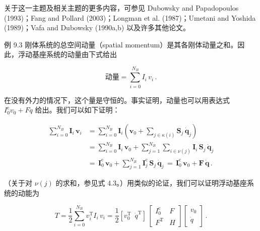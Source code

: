 \documentclass[10pt,a4paper]{book}
\theoremstyle{thmstyle} %
\theoremstyle{defstyle} %
\theoremstyle{prostyle} %
\begin{document}
关于这一主题及相关主题的更多内容，可参见 Dubowsky and Papadopoulos (1993)；Fang and Pollard (2003)；Longman et al. (1987)；Umetani and Yoshida (1989)；Vafa and Dubowsky (1990a,b) 以及许多其他论文。



例 9.3 刚体系统的总空间动量（spatial momentum）是其各刚体动量之和。因此，浮动基座系统的动量由下式给出



$$
动量 = \sum _ { i = 0 } ^{N _ { B} } I _ { i } \, v _ { i } \, .
$$



在没有外力的情况下，这个量是守恒的。事实证明，动量也可以用表达式 $I_{0}^{\mathrm{c}}v_{0}+F\dot{q}$ 给出。我们可以如下证明：



$$
\begin{array}{rl} { \displaystyle \sum _ { i = 0 } ^{N _ { B} } { \boldsymbol { I } } _ { i } \, { \boldsymbol { v } } _ { i } } & { = \displaystyle \sum _ { i = 0 } ^{N _ { B} } { \boldsymbol { I } } _ { i } \left( { \boldsymbol { v } } _ { 0 } + \sum _ { j \in \kappa ( i ) } { \boldsymbol { S } } _ { j } \, { \dot { \boldsymbol { q } } } _ { j } \right) } \\& { = \displaystyle \sum _ { i = 0 } ^{N _ { B} } { \boldsymbol { I } } _ { i } \, { \boldsymbol { v } } _ { 0 } + \displaystyle \sum _ { j = 1 } ^{N _ { B} } \sum _ { i \in \nu ( j ) } { \boldsymbol { I } } _ { i } \, { \boldsymbol { S } } _ { j } \, { \dot { \boldsymbol { q } } } _ { j } } \\& { = \, { \boldsymbol { I } } _ { 0 } ^{\mathrm { c} } \, { \boldsymbol { v } } _ { 0 } + \displaystyle \sum _ { j = 1 } ^{N _ { B} } { \boldsymbol { I } } _ { j } ^{\mathrm { c} } \, { \boldsymbol { S } } _ { j } \, { \dot { \boldsymbol { q } } } _ { j } \, = \, { \boldsymbol { I } } _ { 0 } ^{\mathrm { c} } \, { \boldsymbol { v } } _ { 0 } + { \boldsymbol { F } } \, { \dot { \boldsymbol { q } } } \, . } \end{array}
$$



（关于对 $\nu(j)$ 的求和，参见式 4.3。）用类似的论证，我们可以证明浮动基座系统的动能为



$$
T = \frac { 1 } { 2 } \sum _ { i = 0 } ^{N _ { B} } v _ { i } ^{\mathrm { T} } I _ { i } \, v _ { i } = \frac { 1 } { 2 } \left[ v _ { 0 } ^{\mathrm { T} } \, \, \, \dot { q } ^{\mathrm { T} } \right] \, \left[ \begin{array}{ll} { I _ { 0 } ^{\mathrm { c} } } & { F } \\{ F ^{\mathrm { T} } } & { H } \end{array} \right] \left[ \begin{array}{l} { v _ { 0 } } \\{ \dot { q } } \end{array} \right] \, .
$$
\end{document}
